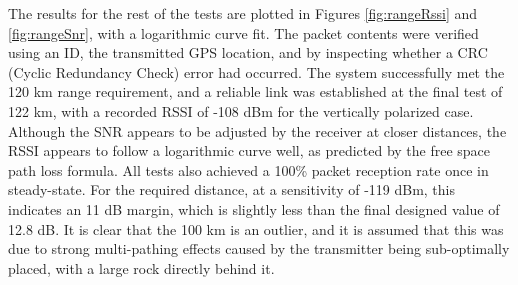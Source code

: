 The results for the rest of the tests are plotted in Figures \ref{fig:rangeRssi} and \ref{fig:rangeSnr}, with a logarithmic curve fit. The packet contents were verified using an ID, the transmitted GPS location, and by inspecting whether a CRC (Cyclic Redundancy Check) error had occurred. The system successfully met the 120 km range requirement, and a reliable link was established at the final test of 122 km, with a recorded RSSI of -108 dBm for the vertically polarized case. Although the SNR appears to be adjusted by the receiver at closer distances, the RSSI appears to follow a logarithmic curve well, as predicted by the free space path loss formula. All tests also achieved a 100\% packet reception rate once in steady-state. For the required distance, at a sensitivity of -119 dBm, this indicates an 11 dB margin, which is slightly less than the final designed value of 12.8 dB. It is clear that the 100 km is an outlier, and it is assumed that this was due to strong multi-pathing effects caused by the transmitter being sub-optimally placed, with a large rock directly behind it. 